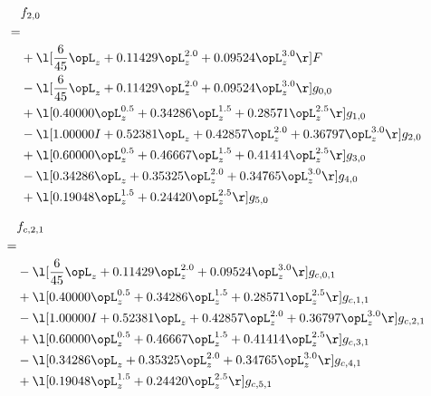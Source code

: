 \begin{alignat}{2} 
\label{eq:f_20_0} 
& f_{2,0} \nonumber \\ 
 = \\ 
& + \l[ \frac{6}{45} \opL_z +  0.11429 \opL_z^{2.0} +  0.09524 \opL_z^{3.0}  \r] F \nonumber \\ 
& - \l[ \frac{6}{45} \opL_z +  0.11429 \opL_z^{2.0} +  0.09524 \opL_z^{3.0}  \r] g_{0,0} \nonumber \\ 
& + \l[  0.40000 \opL_z^{0.5} +  0.34286 \opL_z^{1.5} +  0.28571 \opL_z^{2.5}  \r] g_{1,0} \nonumber \\ 
& - \l[  1.00000 I +  0.52381 \opL_z +  0.42857 \opL_z^{2.0} +  0.36797 \opL_z^{3.0}  \r] g_{2,0} \nonumber \\ 
& + \l[  0.60000 \opL_z^{0.5} +  0.46667 \opL_z^{1.5} +  0.41414 \opL_z^{2.5}  \r] g_{3,0} \nonumber \\ 
& - \l[  0.34286 \opL_z +  0.35325 \opL_z^{2.0} +  0.34765 \opL_z^{3.0}  \r] g_{4,0} \nonumber \\ 
& + \l[  0.19048 \opL_z^{1.5} +  0.24420 \opL_z^{2.5}  \r] g_{5,0} \nonumber \\ 
\end{alignat} 


\begin{alignat}{2} 
\label{eq:f_21_0} 
& f_{c,2,1} \nonumber \\ 
 = \\ 
& - \l[ \frac{6}{45} \opL_z +  0.11429 \opL_z^{2.0} +  0.09524 \opL_z^{3.0}  \r] g_{c,0,1} \nonumber \\ 
& + \l[  0.40000 \opL_z^{0.5} +  0.34286 \opL_z^{1.5} +  0.28571 \opL_z^{2.5}  \r] g_{c,1,1} \nonumber \\ 
& - \l[  1.00000 I +  0.52381 \opL_z +  0.42857 \opL_z^{2.0} +  0.36797 \opL_z^{3.0}  \r] g_{c,2,1} \nonumber \\ 
& + \l[  0.60000 \opL_z^{0.5} +  0.46667 \opL_z^{1.5} +  0.41414 \opL_z^{2.5}  \r] g_{c,3,1} \nonumber \\ 
& - \l[  0.34286 \opL_z +  0.35325 \opL_z^{2.0} +  0.34765 \opL_z^{3.0}  \r] g_{c,4,1} \nonumber \\ 
& + \l[  0.19048 \opL_z^{1.5} +  0.24420 \opL_z^{2.5}  \r] g_{c,5,1} \nonumber \\ 
\end{alignat} 


